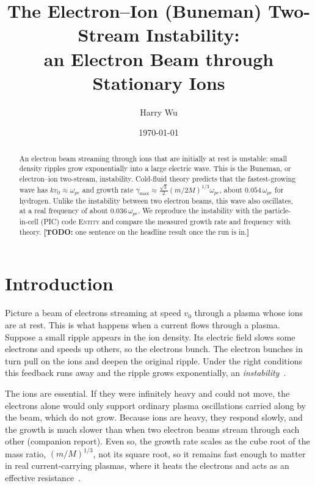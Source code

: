 \documentclass[10pt,twocolumn,letterpaper]{article}
\title{\vspace{-1.5em}The Electron--Ion (Buneman) Two-Stream Instability:\\
       an Electron Beam through Stationary Ions}
\author{Harry Wu}
\date{\today}
\newcommand{\wpe}{\omega_{pe}}        %
\newcommand{\vz}{v_0}                 %
\newif\ifdraft \drafttrue
\newcommand{\todo}[1]{\ifdraft{\color{red}\textbf{[TODO:} #1\textbf{]}}\fi}
\begin{document}
\maketitle

\begin{abstract}
\noindent
An electron beam streaming through ions that are initially at rest is unstable: small density
ripples grow exponentially into a large electric wave. This is the Buneman, or electron--ion
two-stream, instability. Cold-fluid theory predicts that the fastest-growing wave has
$k\vz\approx\wpe$ and growth rate $\gamma_{\max}\approx\tfrac{\sqrt3}{2}(m/2M)^{1/3}\wpe$, about
$0.054\,\wpe$ for hydrogen. Unlike the instability between two electron beams, this wave also
oscillates, at a real frequency of about $0.036\,\wpe$. We reproduce the instability with the
particle-in-cell (PIC) code \textsc{Entity} and compare the measured growth rate and frequency
with theory.
\todo{one sentence on the headline result once the run is in.}
\end{abstract}

\section{Introduction}
\label{sec:intro}

Picture a beam of electrons streaming at speed $\vz$ through a plasma whose ions are at rest.
This is what happens when a current flows through a plasma. Suppose a small ripple appears in
the ion density. Its electric field slows some electrons and speeds up others, so the
electrons bunch. The electron bunches in turn
pull on the ions and deepen the original ripple. Under the right conditions this feedback runs
away and the ripple grows exponentially, an \emph{instability}~\citep{Buneman1959,Chen2016}.

The ions are essential. If they were infinitely heavy and could not move, the electrons alone
would only support ordinary plasma oscillations carried along by the beam, which do not grow.
Because ions are heavy, they respond slowly, and the growth is much slower than when two
electron beams stream through each other (companion report). Even so, the growth rate scales as
the cube root of the mass ratio, $(m/M)^{1/3}$, not its square root, so it remains fast enough to matter in real current-carrying
plasmas, where it heats the electrons and acts as an effective resistance~\citep{Buneman1959}.
\end{document}

